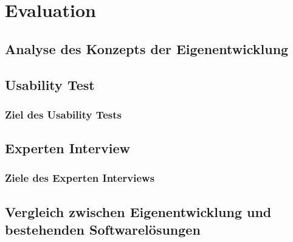 \chapter{Evaluation}
\label{chap:evaluation}

\section{Analyse des Konzepts der Eigenentwicklung}
\section{Usability Test}
    \subsection{Ziel des Usability Tests}

\section{Experten Interview}
    \subsection{Ziele des Experten Interviews}

    \section{Vergleich zwischen Eigenentwicklung und bestehenden Softwarelösungen}